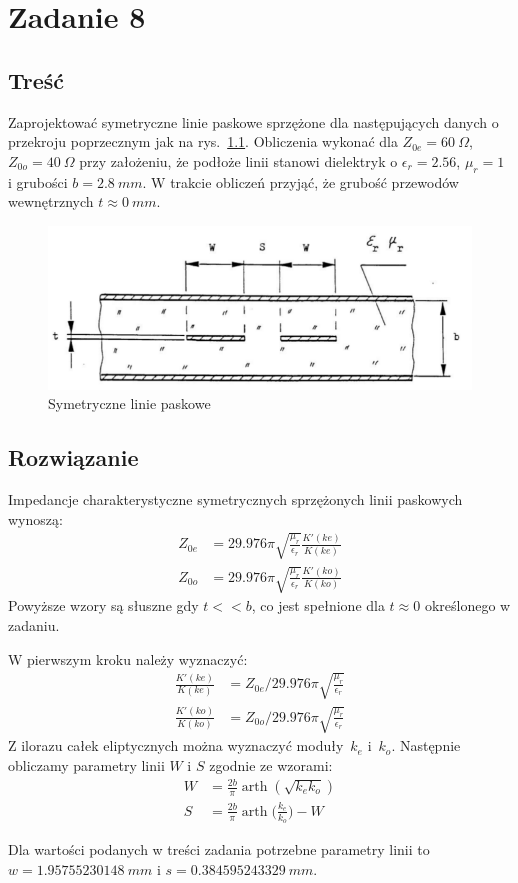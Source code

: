 \documentclass[rep.tex]{subfiles}
\begin{document}
\chapter{Zadanie 8}
\label{zad8}
\section{Treść}
Zaprojektować symetryczne linie paskowe sprzężone dla następujących danych o przekroju poprzecznym jak na rys.~\ref{fig:zad8:cstripline}.
Obliczenia wykonać dla $Z_{0e} = 60~\Omega$, $Z_{0o} = 40~\Omega$ przy założeniu,
że podłoże linii stanowi dielektryk o $\epsilon_r = 2.56$, $\mu_r = 1$ i grubości $b = 2.8~mm$.
W trakcie obliczeń przyjąć, że grubość przewodów wewnętrznych $t \approx 0~mm$.

\begin{figure}[!htbp]
  \centering
  \includegraphics[scale=0.5]{fig/zad8/cstripline}
  \caption{Symetryczne linie paskowe}
  \label{fig:zad8:cstripline}
\end{figure}

\section{Rozwiązanie}
Impedancje charakterystyczne symetrycznych sprzężonych linii paskowych wynoszą:
\begin{align}
  Z_{0e} &= 29.976 \pi \sqrt{\frac{\mu_r}{\epsilon_r}}\frac{K'(ke)}{K(ke)} \\
  Z_{0o} &= 29.976 \pi \sqrt{\frac{\mu_r}{\epsilon_r}}\frac{K'(ko)}{K(ko)}
\end{align}
Powyższe wzory są słuszne gdy $t << b$,
co jest spełnione dla $t \approx 0$ określonego w zadaniu.

W pierwszym kroku należy wyznaczyć:
\begin{align}
  \frac{K'(ke)}{K(ke)} &= Z_{0e} / 29.976 \pi \sqrt{\frac{\mu_r}{\epsilon_r}} \\
  \frac{K'(ko)}{K(ko)} &= Z_{0o} / 29.976 \pi \sqrt{\frac{\mu_r}{\epsilon_r}}
\end{align}
Z ilorazu całek eliptycznych można wyznaczyć moduły~$k_e$ i~$k_o$.
Następnie obliczamy parametry linii $W$ i $S$ zgodnie ze wzorami:
\begin{align}
  W &= \frac{2b}{\pi}\operatorname{arth}(\sqrt{k_ek_o}) \label{eqn:zad8:w} \\
  S &= \frac{2b}{\pi}\operatorname{arth}\Big(\frac{k_e}{k_o}\Big) - W \label{eqn:zad8:s}
\end{align}

Dla wartości podanych w treści zadania potrzebne parametry linii to $w = 1.95755230148~mm$ i $s = 0.384595243329~mm$. 
\end{document}
